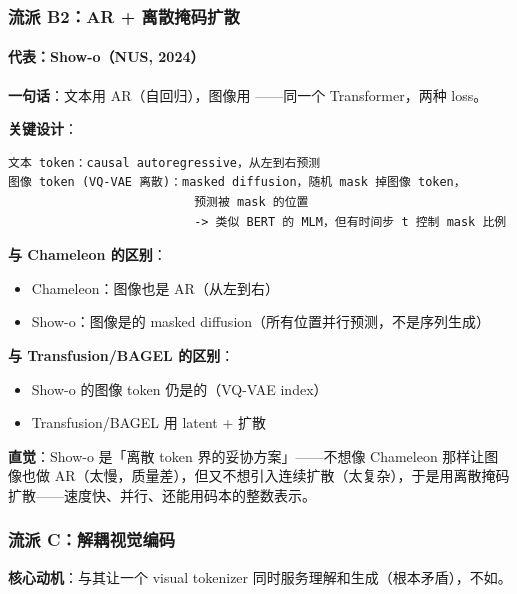\subsubsection{流派 B2：AR + 离散掩码扩散}

\paragraph{代表：Show-o（NUS, 2024）}

\textbf{一句话}：文本用 AR（自回归），图像用 ——同一个 Transformer，两种 loss。

\textbf{关键设计}：
\begin{lstlisting}
文本 token：causal autoregressive，从左到右预测
图像 token (VQ-VAE 离散)：masked diffusion，随机 mask 掉图像 token，
                          预测被 mask 的位置
                          -> 类似 BERT 的 MLM，但有时间步 t 控制 mask 比例
\end{lstlisting}

\begin{conceptbox}
\textbf{与 Chameleon 的区别}：
\begin{itemize}
  \item Chameleon：图像也是 AR（从左到右）
  \item Show-o：图像是的 masked diffusion（所有位置并行预测，不是序列生成）
\end{itemize}
\textbf{与 Transfusion/BAGEL 的区别}：
\begin{itemize}
  \item Show-o 的图像 token 仍是的（VQ-VAE index）
  \item Transfusion/BAGEL 用 latent + 扩散
\end{itemize}
\end{conceptbox}

\begin{intubox}
\textbf{直觉}：Show-o 是「离散 token 界的妥协方案」——不想像 Chameleon 那样让图像也做 AR（太慢，质量差），但又不想引入连续扩散（太复杂），于是用离散掩码扩散——速度快、并行、还能用码本的整数表示。
\end{intubox}

\subsubsection{流派 C：解耦视觉编码}

\begin{conceptbox}
\textbf{核心动机}：与其让一个 visual tokenizer 同时服务理解和生成（根本矛盾），不如。
\end{conceptbox}

